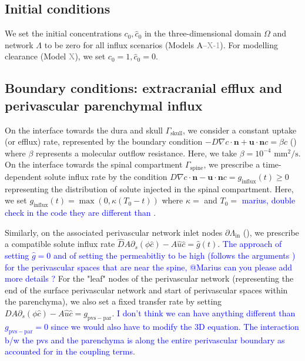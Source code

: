 \documentclass[fleqn,10pt]{wlscirep}
\newcommand{\rami}[1]{\textcolor{blue}{#1}}
\newcommand{\draft}[1]{\textcolor{gray}{#1}}
\begin{document}
\subsection*{Initial conditions}

We set the initial concentrations $c_0, \hat{c}_0$ in the three-dimensional domain $\Omega$ and network $\Lambda$ to be zero for all influx scenarios (Models A--\draft{X-1}). For modelling clearance (Model \draft{X}), we set $c_0 = 1, \hat{c}_0 = 0$.

\subsection*{Boundary conditions: extracranial efflux and perivascular parenchymal influx}

On the interface towards the dura and skull $\Gamma_{\mathrm{skull}}$, we consider a constant uptake (or efflux) rate, represented by the boundary condition $- D \nabla c \cdot \bm{n}  +   \bm u \cdot \bm n c  = \beta c $ () where $\beta$ represents a molecular outflow resistance. Here, we take $\beta = 10^{-4} \,\, \mathrm{mm}^2/\mathrm{s}$\cite{hornkjol2022csf}. On the interface towards the spinal compartment $\Gamma_{\mathrm{spine}}$, we prescribe a time-dependent solute influx rate by the condition $D \nabla c \cdot \bm{n}  -  \bm u \cdot \bm n  c = g_{\mathrm{influx}}(t) \geq 0$ representing the distribution of solute injected in the spinal compartment. Here, we set $g_\mathrm{influx}(t) = \max(0, \kappa (T_0 - t))$ where $\kappa  = $ and $T_0 = $ \rami{marius, double check in the code they are different than \cite{hornkjol2022csf}}. 

Similarly, on the associated perivascular network inlet nodes $\partial \Lambda_{\mathrm{in}}$ (), we prescribe a compatible solute influx rate $\hat D A \partial_s (\phi \hat c) - A \hat u \hat c  = \hat g(t)$. \rami{The approach of setting $\hat g = 0$ and of setting the permeabitliy to be high (follows the arguments \cite{eide2024functional}) for the perivascular spaces that are near the spine, @Marius can you please add more details ? } For the "leaf" nodes of the perivascular network (representing the end of the surface perivascular network and start of perivascular spaces within the parenchyma), we also set a fixed transfer rate by setting $ D A \partial_s (\phi \hat c) - A \hat u \hat c  = g_{\mathrm{pvs-par}}$. \rami{I don't think we can have anything different than $g_{\mathrm{pvs-par}} = 0$ since we would also have to modify the 3D equation. The interaction b/w the pvs and the parenchyma is along the entire perivascular boundary as accounted for in the coupling terms}. 
\end{document}
